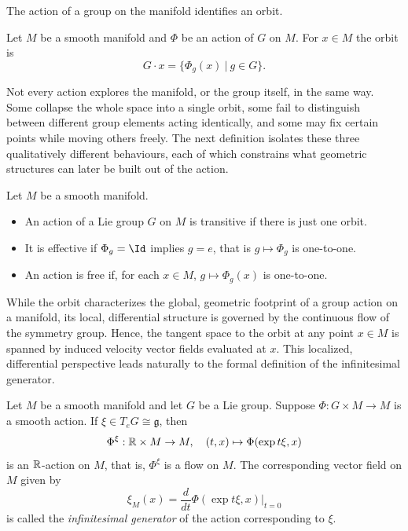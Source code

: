 \noindent The action of a group on the manifold identifies an orbit. 

\begin{definition}[Orbit]\label{def:orbit}
	Let $M$ be a smooth manifold and $\Phi$ be an action of $G$ on $M$. For $x \in M$ the orbit is
	\[
		G \cdot x = \{\Phi_g(x) \ | \ g \in G\}.
	\]
\end{definition}

Not every action explores the manifold, or the group itself, in the same way. Some collapse the whole space into a single orbit, some fail to distinguish between different group elements acting identically, and some may fix certain points while moving others freely. The next definition isolates these three qualitatively different behaviours, each of which constrains what geometric structures can later be built out of the action.

\begin{definition}\label{def:action-prop}
	Let $M$ be a smooth manifold. 
	\begin{itemize}
		\item An action of a Lie group $G$ on $M$ is transitive if there is just one orbit. 
		\item It is effective if $\Phi_g = \Id$ implies $g = e$, that is $g \mapsto \Phi_g$ is one-to-one. 
		\item An action is free if, for each $x \in M$, $g \mapsto \Phi_g(x)$ is one-to-one.
	\end{itemize}
\end{definition}

While the orbit characterizes the global, geometric footprint of a group action on a manifold, its local, differential structure is governed by the continuous flow of the symmetry group. Hence, the tangent space to the orbit at any point $x \in M$ is spanned by induced velocity vector fields evaluated at $x$. This localized, differential perspective leads naturally to the formal definition of the infinitesimal generator.

\begin{definition}\label{def:inf-generator}
	Let $M$ be a smooth manifold and let $G$ be a Lie group. Suppose $\Phi: G \times M \to M$ is a smooth action. If $\xi \in T_eG \cong \mathfrak{g}$, then
	\[
	\Phi^\xi: \mathbb{R} \times M \to M, \quad (t, x) \mapsto \Phi(\exp t\xi, x)
	\]
	is an $\mathbb{R}$-action on $M$, that is, $\Phi^\xi$ is a flow on $M$. The corresponding vector field on $M$ given by
	\[
	\xi_M(x) = \frac{d}{dt} \Phi(\exp t\xi, x) \bigg|_{t=0}
	\]
	is called the \emph{infinitesimal generator} of the action corresponding to $\xi$.
\end{definition}

